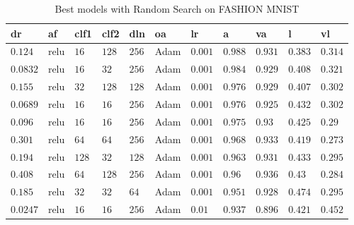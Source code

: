 \begin{table}[htbp]\scriptsize
\begin{tabular}{|p{}p{}p{}p{}p{}p{}p{}p{}p{}p{}p{}|}\hline
dr & af & clf1 & clf2 & dln & oa & lr & a & va & l & vl \\ \hline
$0.124$ & relu & $16$ & $128$ & $256$ & Adam & $0.001$ & $0.988$ & $0.931$ & $0.383$ & $0.314$ \\
$0.0832$ & relu & $16$ & $32$ & $256$ & Adam & $0.001$ & $0.984$ & $0.929$ & $0.408$ & $0.321$ \\
$0.155$ & relu & $32$ & $128$ & $128$ & Adam & $0.001$ & $0.976$ & $0.929$ & $0.407$ & $0.302$ \\
$0.0689$ & relu & $16$ & $16$ & $256$ & Adam & $0.001$ & $0.976$ & $0.925$ & $0.432$ & $0.302$ \\
$0.096$ & relu & $16$ & $16$ & $256$ & Adam & $0.001$ & $0.975$ & $0.93$ & $0.425$ & $0.29$ \\
$0.301$ & relu & $64$ & $64$ & $256$ & Adam & $0.001$ & $0.968$ & $0.933$ & $0.419$ & $0.273$ \\
$0.194$ & relu & $128$ & $32$ & $128$ & Adam & $0.001$ & $0.963$ & $0.931$ & $0.433$ & $0.295$ \\
$0.408$ & relu & $64$ & $128$ & $256$ & Adam & $0.001$ & $0.96$ & $0.936$ & $0.43$ & $0.284$ \\
$0.185$ & relu & $32$ & $32$ & $64$ & Adam & $0.001$ & $0.951$ & $0.928$ & $0.474$ & $0.295$ \\
$0.0247$ & relu & $16$ & $16$ & $256$ & Adam & $0.01$ & $0.937$ & $0.896$ & $0.421$ & $0.452$ \\
\hline
\end{tabular}\vspace{0.1cm}
	\caption{Best models with Random Search on FASHION MNIST}
	\label{tab:random_params}
\end{table}
